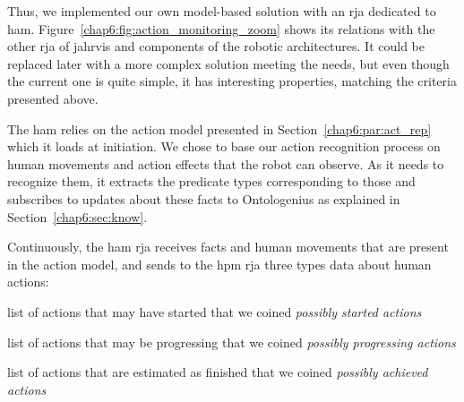 \documentclass[a4paper,11pt,twoside]{StyleThese}
\begin{document}
Thus, we implemented our own model-based solution with an \acrshort{rja} dedicated to \acrfull{ham}. Figure~\ref{chap6:fig:action_monitoring_zoom} shows its relations with the other \acrshort{rja} of \acrshort{jahrvis}  and components of the robotic architectures. It could be replaced later with a more complex solution meeting the needs, but even though the current one is quite simple, it has interesting properties, matching the criteria presented above.

The \acrshort{ham} relies on the action model presented in Section~\ref{chap6:par:act_rep} which it loads at initiation. We chose to base our action recognition process on human movements and action effects that the robot can observe. As it needs to recognize them, it extracts the predicate types corresponding to those and subscribes to updates about these facts to Ontologenius as explained in Section~\ref{chap6:sec:know}. 

Continuously, the \acrshort{ham} \acrshort{rja} receives facts and human movements that are present in the action model, and sends to the \acrfull{hpm} \acrshort{rja} three types data about human actions: 
\begin{bulletList}
	\item list of actions that may have started that we coined \emph{possibly started actions}
	\item list of actions that may be progressing that we coined \emph{possibly progressing actions}
	\item list of actions that are estimated as finished that we coined \emph{possibly achieved actions} 
\end{bulletList}
\end{document}
